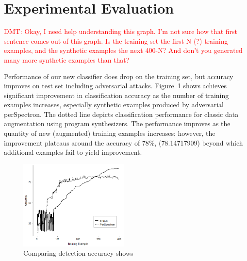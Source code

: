 \section{Experimental Evaluation}\label{results}












\textcolor{red}{DMT: Okay, I need help understanding this graph.  I'm not sure how that first sentence
comes out of this graph.  Is the training set the first N (?) training examples, and the synthetic 
examples the next 400-N?  And don't you generated many more synthetic examples than that?
}

 Performance of our new classifier does drop on the training set, but accuracy improves on test set including adversarial attacks. Figure~\ref{fig:accuracy} shows \scheme achieves significant improvement in classification accuracy as the number of training examples increases, especially synthetic examples produced by adversarial perSpectron. The dotted line depicts classification performance for classic data augmentation using program synthesizers. The performance improves as the quantity of new (augmented) training examples increases; however, the improvement plateaus around the accuracy of 78\%, (78.14717909)
 beyond which additional examples fail to yield improvement.
 
\begin{figure}[ht!] 
\centering
\includegraphics[width=0.49\textwidth]{PerSpectron-Micro2020-camera-R/img/adverse88.png}
\vspace*{-4mm}
\caption{Comparing detection accuracy shows 
  \scheme{} 
}
\label{fig:accuracy}
\end{figure}

